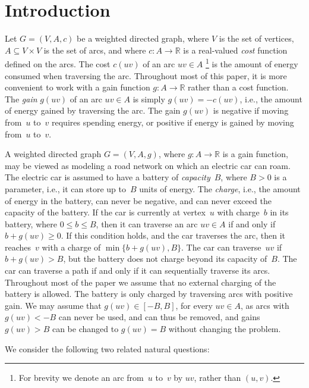 \documentclass[11pt]{article}
\newcommand{\RR}{\mathbb{R}}
\begin{document}
\section{Introduction}\label{S:intro}

Let $G=(V,A,c)$ be a weighted directed graph, where $V$ is the set of vertices,  $A\subseteq V\times V$ is the set of arcs, and where $c:A\to\RR$ is a real-valued \emph{cost} function defined on the arcs. The cost $c(uv)$ of an arc $uv\in A$ \footnote{For brevity we denote an arc from~$u$ to~$v$ by $uv$, rather than $(u,v)$.} is the amount of energy consumed when traversing the arc. Throughout most of this paper, it is more convenient to work with a gain function $g:A\to\RR$ rather than a cost function. The \emph{gain} $g(uv)$ of an arc $uv\in A$ is simply $g(uv)=-c(uv)$, i.e., the amount of energy gained by traversing the arc.
The gain $g(uv)$ is negative if moving from~$u$ to~$v$ requires spending energy, or positive if energy is gained by moving from~$u$ to~$v$.

A weighted directed graph $G=(V,A,g)$, where $g:A\to\RR$ is a gain function, may be viewed as modeling a road network on which an electric car can roam. The electric car is assumed to have a battery of \emph{capacity}~$B$, where $B>0$ is a parameter, i.e., it can store up to~$B$ units of energy. The \emph{charge}, i.e., the amount of energy in the battery, can never be negative, and can never exceed the capacity of the battery. If the car is currently at vertex~$u$ with charge~$b$ in its battery, where $0\le b\le B$, then it can traverse an arc $uv\in A$ if and only if $b+g(uv)\ge 0$. If this condition holds, and the car traverses the arc, then it reaches~$v$ with a charge of $\min\{b+g(uv),B\}$. The car can traverse~$uv$ if $b+g(uv)>B$, but the battery does not charge beyond its capacity of~$B$. The car can traverse a path if and only if it can sequentially traverse its arcs. Throughout most of the paper we assume that no external charging of the battery is allowed. The battery is only charged by traversing arcs with positive gain. We may assume that $g(uv)\in[-B,B]$, for every $uv\in A$, as arcs with $g(uv)<-B$ can never be used, and can thus be removed, and gains $g(uv)>B$ can be changed to $g(uv)=B$ without changing the problem.

We consider the following two related natural questions:
\end{document}
